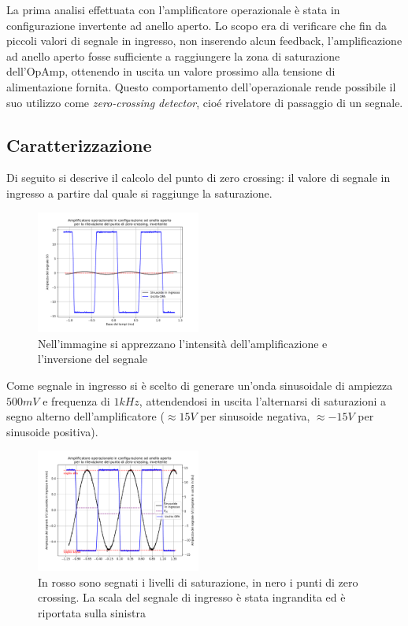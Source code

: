\documentclass[journal]{IEEEtran}
\begin{document}
La prima analisi effettuata con l'amplificatore operazionale è stata in configurazione invertente ad anello aperto. Lo scopo era di verificare che fin da piccoli valori di segnale in ingresso, non inserendo alcun feedback, l'amplificazione ad anello aperto fosse sufficiente a raggiungere la zona di saturazione dell'OpAmp, ottenendo in uscita un valore prossimo alla tensione di alimentazione fornita.
Questo comportamento dell'operazionale rende possibile il suo utilizzo come \textit{zero-crossing detector}, cioé rivelatore di passaggio di un segnale.
\subsection{\textbf{Caratterizzazione}}
Di seguito si descrive il calcolo del punto di zero crossing: il valore di segnale in ingresso a partire dal quale si raggiunge la saturazione.

\begin{figure}[h]%
\begin {center}
\includegraphics[width=0.48\textwidth]{analysis/output/opa-open-loop-inv-zero-crossing.pdf}
\caption{Nell'immagine si apprezzano l'intensità dell'amplificazione e l'inversione del segnale}
\label{fig:open_loop_inv_zc_1}
\end {center}
\end{figure}

Come segnale in ingresso si è scelto di generare un'onda sinusoidale di ampiezza $500 mV$ e frequenza di $1kHz$, attendendosi in uscita l'alternarsi di saturazioni a segno alterno dell'amplificatore ($ \approx 15 V$ per sinusoide negativa, $\approx -15 V$ per sinusoide positiva).

\begin{figure}[h]%
\begin {center}
\includegraphics[width=0.48\textwidth]{analysis/output/opa-open-loop-inv-zero-crossing-z2.pdf}
\caption{In rosso sono segnati i livelli di saturazione, in nero i punti di zero crossing. La scala del segnale di ingresso è stata ingrandita ed è riportata sulla sinistra}
\label{fig:open_loop_inv_zc_2}
\end {center}
\end{figure}
\end{document}
